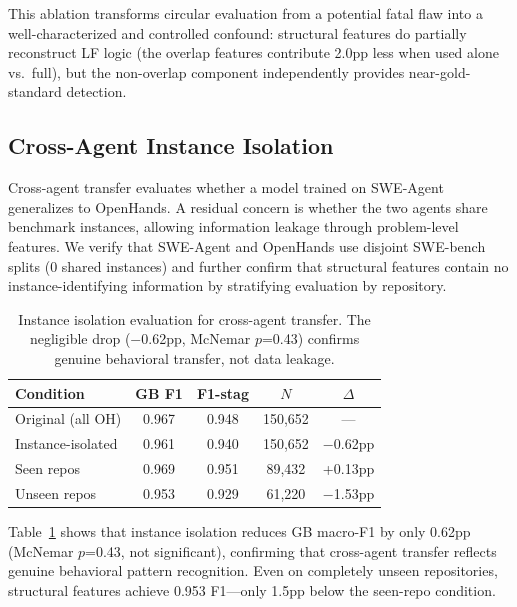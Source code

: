 \documentclass[11pt,a4paper]{article}
\begin{document}
This ablation transforms circular evaluation from a potential fatal flaw into a well-characterized and controlled confound: structural features do partially reconstruct LF logic (the overlap features contribute 2.0pp less when used alone vs.\ full), but the non-overlap component independently provides near-gold-standard detection.

\subsection{Cross-Agent Instance Isolation}
\label{sec:isolation}

Cross-agent transfer evaluates whether a model trained on SWE-Agent generalizes to OpenHands.
A residual concern is whether the two agents share benchmark instances, allowing information leakage through problem-level features.
We verify that SWE-Agent and OpenHands use disjoint SWE-bench splits (0 shared instances) and further confirm that structural features contain no instance-identifying information by stratifying evaluation by repository.

\begin{table}[t]
\centering
\small
\begin{tabular}{lcccc}
\toprule
\textbf{Condition} & \textbf{GB F1} & \textbf{F1-stag} & \textbf{$N$} & \textbf{$\Delta$} \\
\midrule
Original (all OH)    & 0.967 & 0.948 & 150,652 & --- \\
Instance-isolated    & 0.961 & 0.940 & 150,652 & $-$0.62pp \\
\quad Seen repos     & 0.969 & 0.951 & 89,432  & +0.13pp \\
\quad Unseen repos   & 0.953 & 0.929 & 61,220  & $-$1.53pp \\
\bottomrule
\end{tabular}
\caption{Instance isolation evaluation for cross-agent transfer. The negligible drop ($-$0.62pp, McNemar $p$=0.43) confirms genuine behavioral transfer, not data leakage.}
\label{tab:isolation}
\end{table}

Table~\ref{tab:isolation} shows that instance isolation reduces GB macro-F1 by only 0.62pp (McNemar $p$=0.43, not significant), confirming that cross-agent transfer reflects genuine behavioral pattern recognition.
Even on completely unseen repositories, structural features achieve 0.953 F1---only 1.5pp below the seen-repo condition.
\end{document}
